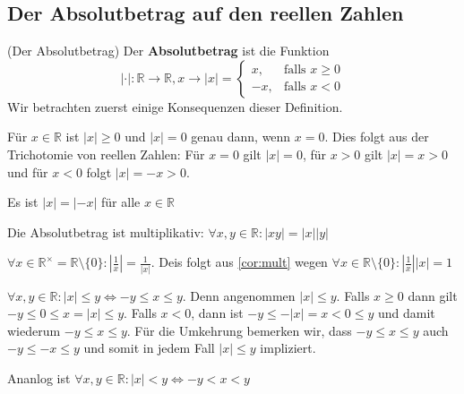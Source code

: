 \documentclass[../Analysis1_script.tex]{subfiles}
\begin{document}
\subsection{Der Absolutbetrag auf den reellen Zahlen}

\begin{definition}{(Der Absolutbetrag)}
	Der \textbf{Absolutbetrag} ist die Funktion
	\[|\cdot| : \mathbb{R} \to \mathbb{R}, x \to |x| = 
		\begin{cases}
			x, &\text{falls } x \geq 0\\
			-x, &\text{falls } x < 0
		\end{cases}
	\]
	Wir betrachten zuerst einige Konsequenzen dieser Definition.
\end{definition}

\begin{corollary}
	Für $x \in \mathbb{R}$ ist $|x| \geq 0$ und $|x| = 0$ genau dann, wenn $x = 0$. Dies folgt aus der Trichotomie von reellen Zahlen: Für $x = 0$ gilt $|x| = 0$, für $x > 0$ gilt $|x| = x > 0$ und für $x < 0$ folgt $|x| = -x > 0$.
\end{corollary}

\begin{corollary}
	Es ist $|x| = |-x|$ für alle $x \in \mathbb{R}$
\end{corollary}

\begin{corollary}\label{cor:mult}
	Die Absolutbetrag ist multiplikativ: $\forall x, y \in \mathbb{R}: |xy| = |x||y|$
\end{corollary}

\begin{corollary}
	$\forall x \in \mathbb{R}^{\times} = \mathbb{R} \setminus \{0\}: |\frac{1}{x}| = \frac{1}{|x|}$. Deis folgt aus \ref{cor:mult} wegen $\forall x \in \mathbb{R} \setminus\{0\}: |\frac{1}{x}||x| = 1$ 
\end{corollary}

\begin{corollary}
	$\forall x, y \in \mathbb{R}: |x| \leq y \iff -y \leq x \leq y$. Denn angenommen $|x| \leq y$. Falls $x \geq 0$ dann gilt $-y \leq 0 \leq x = |x| \leq y$. Falls $x < 0$, dann ist $-y \leq -|x| = x < 0 \leq y$ und damit wiederum $-y \leq x \leq y$. Für die Umkehrung bemerken wir, dass $-y \leq x \leq y$ auch $-y \leq -x \leq y$ und somit in jedem Fall $|x| \leq y$ impliziert.
\end{corollary}

\begin{corollary}
	Ananlog ist $\forall x, y \in \mathbb{R}: |x| < y \iff -y < x < y$
\end{corollary}
\end{document}
